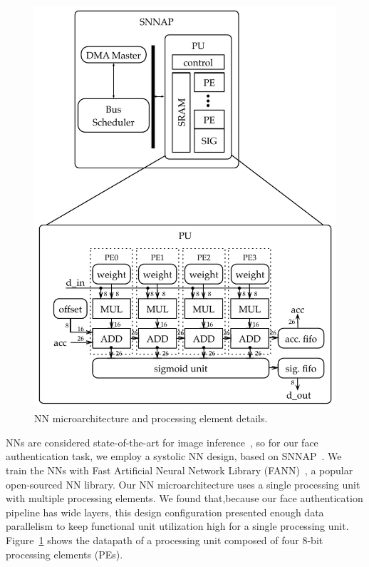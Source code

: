 \begin{figure}
  \includegraphics[width=\textwidth]{nsp-figs/snnap_pu_new.pdf}
  \caption{NN microarchitecture and processing element details.}
  \label{fig:snnap-pu}
\end{figure}

NNs are considered state-of-the-art for image inference~\cite{amos2016openface}, so for our face authentication task, we employ a systolic NN design, based on SNNAP~\cite{snnap,moreau-bitwidth}.
We train the NNs with Fast Artificial Neural Network Library (FANN)~\cite{fann}, a popular open-sourced NN library.
Our NN microarchitecture uses a single processing unit with multiple processing elements.
We found that,because our face authentication pipeline has wide layers, this design configuration presented enough data parallelism to keep functional unit utilization high for a single processing unit.
Figure~\ref{fig:snnap-pu} shows the datapath of a processing unit composed of four 8-bit processing elements (PEs).

